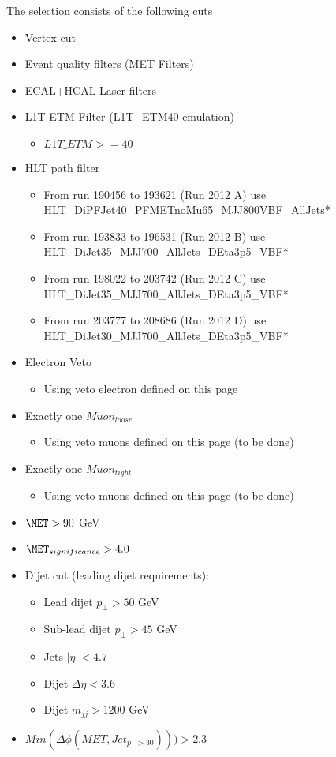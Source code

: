The selection consists of the following cuts
\begin{itemize}
  \item Vertex cut 
  \item Event quality filters (MET Filters)
  \item ECAL+HCAL Laser filters
  \item L1T ETM Filter (L1T\_ETM40 emulation)
  \begin{itemize}
    \item $ L1T\_ETM >= 40 $
  \end{itemize}
  \item HLT path filter
  \begin{itemize}
    \item From run 190456 to 193621 (Run 2012 A) use HLT\_DiPFJet40\_PFMETnoMu65\_MJJ800VBF\_AllJets* 
    \item From run 193833 to 196531 (Run 2012 B) use HLT\_DiJet35\_MJJ700\_AllJets\_DEta3p5\_VBF*
    \item From run 198022 to 203742 (Run 2012 C) use HLT\_DiJet35\_MJJ700\_AllJets\_DEta3p5\_VBF*
    \item From run 203777 to 208686 (Run 2012 D) use HLT\_DiJet30\_MJJ700\_AllJets\_DEta3p5\_VBF*
  \end{itemize}
  \item Electron Veto
  \begin{itemize}
    \item Using veto electron defined on this page
  \end{itemize}
  \item Exactly one $Muon_{loose}$
  \begin{itemize}
    \item Using veto muons defined on this page (to be done)
  \end{itemize}
  \item Exactly one $Muon_{tight}$
  \begin{itemize}
    \item Using veto muons defined on this page (to be done)
  \end{itemize}
  \item $\MET > 90 $ GeV
  \item $\MET_{significance} > 4.0 $
  \item Dijet cut (leading dijet requirements):
  \begin{itemize}
    \item Lead dijet $ p_{\perp} > 50$ GeV
    \item Sub-lead dijet $ p_{\perp} > 45$ GeV
    \item Jets $ |\eta| < 4.7 $
    \item Dijet $ \Delta\eta < 3.6 $
    \item Dijet $ m_{jj} > 1200 $ GeV
  \end{itemize}
  \item $ Min(\Delta\phi(MET,Jet_{p_{\perp}>30})))>2.3 $
\end{itemize}

